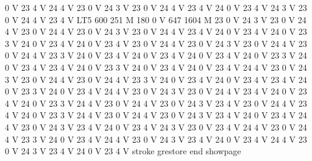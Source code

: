 0 V 23 4 V 24 4 V 23 0 V 24 3 V 23 0 V 24 4 V 23 4 V 24 0 V 23 4 V
24 3 V 23 0 V 24 4 V 23 4 V LT5 600 251 M 180 0 V 647 1604 M 23 0 V
24 3 V 23 0 V 24 4 V 23 0 V 24 4 V 23 0 V 24 3 V 23 0 V 24 4 V 23 4
V 24 0 V 23 4 V 24 0 V 23 3 V 24 0 V 23 4 V 24 0 V 23 4 V 23 0 V 24
4 V 23 0 V 24 3 V 23 0 V 24 4 V 23 0 V 24 4 V 23 3 V 24 0 V 23 4 V
24 0 V 23 4 V 24 0 V 23 4 V 24 0 V 23 3 V 24 0 V 23 4 V 23 4 V 24 0
V 23 3 V 24 0 V 23 4 V 24 0 V 23 4 V 24 4 V 23 0 V 24 3 V 23 0 V 24
4 V 23 0 V 24 4 V 23 3 V 24 0 V 23 4 V 24 0 V 23 4 V 23 4 V 24 0 V
23 3 V 24 0 V 23 4 V 24 4 V 23 0 V 24 3 V 23 0 V 24 4 V 23 4 V 24 0
V 23 4 V 24 0 V 23 3 V 24 4 V 23 0 V 24 4 V 23 0 V 24 3 V 23 4 V 23
0 V 24 4 V 23 4 V 24 0 V 23 3 V 24 4 V 23 0 V 24 4 V 23 0 V 24 3 V
23 4 V 24 0 V 23 4 V 24 4 V 23 0 V 24 3 V 23 4 V 24 0 V 23 4 V 24 3
V 23 0 V 23 4 V 24 4 V 23 0 V 24 4 V 23 3 V 24 0 V 23 4 V 24 4 V 23
0 V 24 3 V 23 4 V 24 0 V 23 4 V 24 4 V 23 0 V 24 3 V 23 4 V 24 0 V
23 4 V stroke grestore end showpage
 
